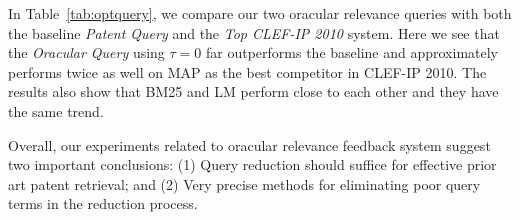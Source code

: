 In Table~\ref{tab:optquery}, we compare our two oracular relevance
queries with both the baseline \emph{Patent Query} and the \emph{Top
CLEF-IP 2010} system.  Here we see that
the {\em Oracular Query} using $\tau=0$ far outperforms the baseline and
approximately performs twice as well on MAP as the best competitor in
CLEF-IP 2010. The results also show that BM25 and LM perform close to each other and they have the same trend.

%
%


Overall, our experiments related to oracular relevance feedback system
suggest two important conclusions: (1) Query reduction should suffice for effective prior art patent retrieval; and (2) Very precise methods for eliminating poor query terms in the reduction process.


